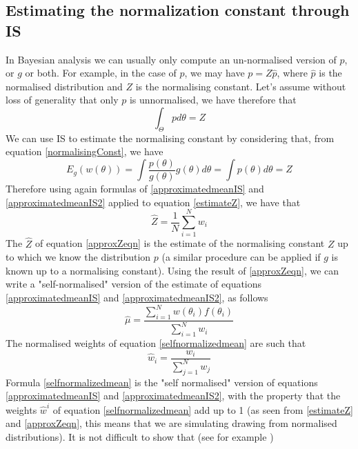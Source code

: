 \documentclass[12pt,mythesisstyle]{report}
\begin{document}
\subsection{Estimating the normalization constant through IS}
In Bayesian analysis we can usually only compute an un-normalised version of $p$, or $g$ or both. For example, in the case of $p$, we may have $p=Z\hat{p}$, where $\hat{p}$ is the normalised distribution and $Z$ is the normalising constant. Let's assume without loss of generality that only $p$ is unnormalised, we have therefore that
\begin{equation}\label{normalisingConst}
\int_\Theta p d\theta=Z 
\end{equation}
We can use IS to estimate the normalising constant by considering that, from equation \eqref{normalisingConst}, we have
\begin{equation}\label{estimateZ}
E_{g}(w(\theta))=\int \frac{p(\theta)}{g(\theta)}g(\theta) d\theta= \int p(\theta) d\theta=Z
\end{equation}
Therefore using again formulas of \eqref{approximatedmeanIS} and \eqref{approximatedmeanIS2} applied to equation \eqref{estimateZ}, we have that
\begin{equation}\label{approxZeqn}
\hat{Z}=\frac{1}{N}\sum_{i=1}^{N}w_{i}
\end{equation}
The $\hat{Z}$ of equation \eqref{approxZeqn} is the estimate of the normalising constant $Z$ up to which we know the distribution $p$ (a similar procedure can be applied if $g$ is known up to a normalising constant). Using the result of \eqref{approxZeqn}, we can write a "self-normalised" version of the estimate of equations \eqref{approximatedmeanIS} and \eqref{approximatedmeanIS2}, as follows
\begin{equation}\label{selfnormalizedmean}
\hat{\mu}=\frac{\sum_{i=1}^{N}w(\theta_{i})f(\theta_{i})}{\sum_{i=1}^{N}w_{i}}
\end{equation}
The normalised weights of equation \eqref{selfnormalizedmean} are such that
\begin{equation}\label{selfnormalizedweight}
\hat{w}_{i}=\frac{w_{i}}{\sum_{j=1}^{N}w_{j}}
\end{equation}
Formula  \eqref{selfnormalizedmean} is the "self normalised" version of equations \eqref{approximatedmeanIS} and \eqref{approximatedmeanIS2}, with the property that the weights $\hat{w}^{i}$ of equation  \eqref{selfnormalizedmean} add up to 1 (as seen from \eqref{estimateZ} and \eqref{approxZeqn}, this means that we are simulating drawing from normalised distributions). It is not difficult to show that (see for example \cite{mcmcnotes}) 
\end{document}
